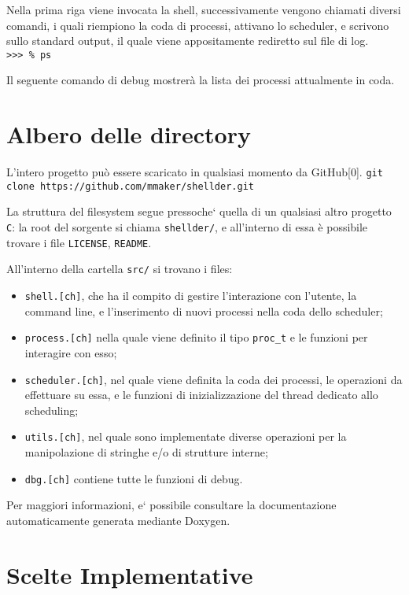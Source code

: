 \documentclass[11pt]{article}
\begin{document}
\noindent Nella prima riga viene invocata la shell, successivamente vengono chiamati diversi comandi, i quali riempiono la coda di processi, attivano lo scheduler, e scrivono sullo standard output, il quale viene appositamente rediretto sul file di log.
\\ \texttt{>>> \% ps}

\noindent Il seguente comando di debug mostrer\`a la lista dei processi attualmente in coda.

\section{Albero delle directory}

L'intero progetto pu\`o essere scaricato in qualsiasi momento da GitHub[0].
\texttt{git clone https://github.com/mmaker/shellder.git}

La struttura del filesystem segue pressoche` quella di un qualsiasi altro progetto \texttt{C}: la root del sorgente si chiama \texttt{shellder/}, e all'interno di essa \`e possibile trovare i file \texttt{LICENSE}, \texttt{README}.

All'interno della cartella \texttt{src/} si trovano i files: 
\begin{itemize}
\item \texttt{shell.[ch]}, che ha il compito di gestire l'interazione con l'utente, la command line, e l'inserimento di nuovi processi nella coda dello scheduler;
\item \texttt{process.[ch]} nella quale viene definito il tipo \texttt{proc\_t} e le funzioni per interagire con esso;
\item \texttt{scheduler.[ch]}, nel quale viene definita la coda dei processi, le operazioni da effettuare su essa, e le funzioni di inizializzazione del thread dedicato allo scheduling;
\item \texttt{utils.[ch]}, nel quale sono implementate diverse operazioni per la manipolazione di stringhe e/o di strutture interne;
\item \texttt{dbg.[ch]} contiene tutte le funzioni di debug.
\end{itemize}

Per maggiori informazioni, e` possibile consultare la documentazione automaticamente generata mediante Doxygen.

\section{Scelte Implementative}
\end{document}
